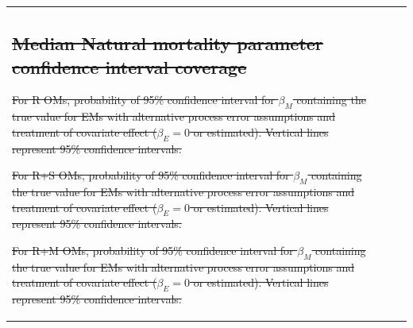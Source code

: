 \documentclass[
  12pt,
]{article}
\makeatletter
\providecommand{\DIFdel}[1]{{\protect\color{red}\sout{#1}}} %
\providecommand{\DIFdelFL}[1]{\DIFdel{#1}} %
\let\sout@orig\sout %
\renewcommand{\sout}[1]{\ifmmode\text{\sout@orig{\ensuremath{#1}}}\else\sout@orig{#1}\fi} %
\makeatother
\begin{document}
\begin{table}
{\begin{center}
\begin{tabular}{lrrr}
\subsection*{\DIFdel{Median Natural mortality parameter confidence interval coverage}}%
\addcontentsline{toc}{subsection}{\DIFdel{Median Natural mortality parameter confidence interval coverage}}

{%
\DIFdelFL{For R OMs, probability of 95\% confidence interval for $\beta_M$ containing the true value for EMs with alternative process error assumptions and treatment of covariate effect ($\beta_E = 0$ or estimated). Vertical lines represent 95\% confidence intervals.}}%

{%
\DIFdelFL{For R+S OMs, probability of 95\% confidence interval for $\beta_M$ containing the true value for EMs with alternative process error assumptions and treatment of covariate effect ($\beta_E = 0$ or estimated). Vertical lines represent 95\% confidence intervals.}}%

{%
\DIFdelFL{For R+M OMs, probability of 95\% confidence interval for $\beta_M$ containing the true value for EMs with alternative process error assumptions and treatment of covariate effect ($\beta_E = 0$ or estimated). Vertical lines represent 95\% confidence intervals.}}%


\end{tabular}
\end{center}}
\end{table}
\end{document}
